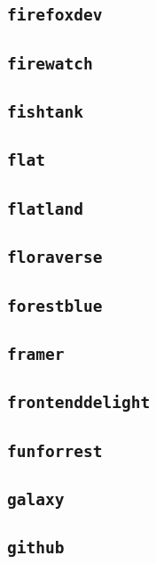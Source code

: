 \subsection{\texttt{firefoxdev}}
\newpage
\subsection{\texttt{firewatch}}
\newpage
\subsection{\texttt{fishtank}}
\newpage
\subsection{\texttt{flat}}
\newpage
\subsection{\texttt{flatland}}
\newpage
\subsection{\texttt{floraverse}}
\newpage
\subsection{\texttt{forestblue}}
\newpage
\subsection{\texttt{framer}}
\newpage
\subsection{\texttt{frontenddelight}}
\newpage
\subsection{\texttt{funforrest}}
\newpage
\subsection{\texttt{galaxy}}
\newpage
\subsection{\texttt{github}}
\newpage

